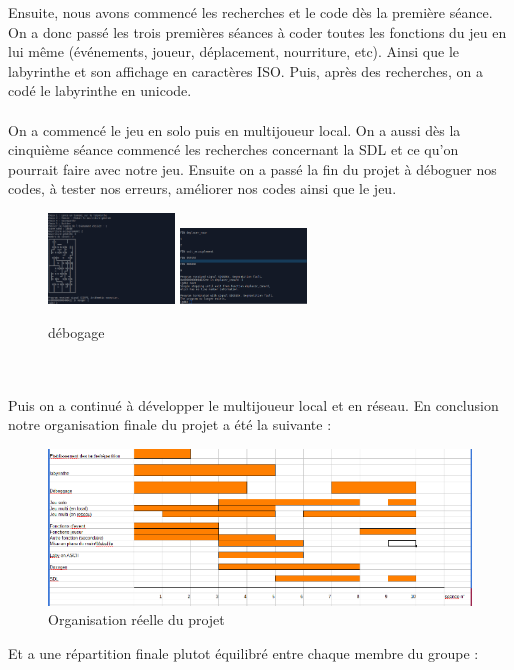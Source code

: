 \documentclass[12pt,a4paper,twoside]{article}
\begin{document}
Ensuite, nous avons commencé les recherches et le code dès la première séance.
On a donc passé les trois premières séances à coder toutes les fonctions du jeu en lui même (événements, joueur, déplacement, nourriture, etc). Ainsi que le labyrinthe et son affichage en caractères ISO.
Puis, après des recherches, on a codé le labyrinthe en unicode.
\\
\\
On a commencé le jeu en solo puis en multijoueur local. On a aussi dès la cinquième séance commencé les recherches concernant la SDL et ce qu'on pourrait faire avec notre jeu. Ensuite on a passé la fin du projet à déboguer nos codes, à tester nos erreurs, améliorer nos codes ainsi que le jeu.
\begin {figure}[h]
\includegraphics[width=0.3\textwidth]{IMG/debbeug.png}
\hspace{100pt}
\includegraphics[width=0.3\textwidth]{IMG/debug.png}
\caption{\label {ref3}débogage}
\end {figure}
\\
\\
Puis on a continué à développer le multijoueur local et en réseau.
En conclusion notre organisation finale du projet a été la suivante :
\begin {figure}[h]
\includegraphics[width=1.1\textwidth]{IMG/grantt.png}
\caption{\label {ref4}Organisation réelle du projet}
\end {figure}
Et a une répartition finale plutot équilibré entre chaque membre du groupe : \\
\end{document}
